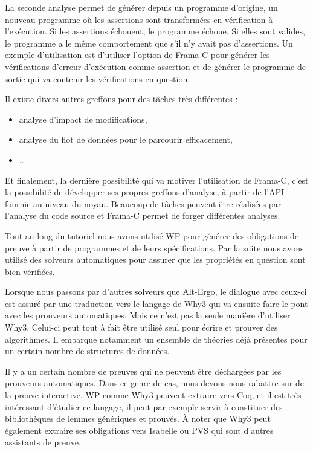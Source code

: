 \documentclass[middle]{zmdocument}
\begin{document}
La seconde analyse permet de générer depuis un programme d'origine, un nouveau
programme où les assertions sont transformées en vérification à l'exécution. Si
les assertions échouent, le programme échoue. Si elles sont valides, le programme
a le même comportement que s'il n'y avait pas d'assertions. Un exemple 
d'utilisation est d'utiliser l'option  de Frama-C pour générer les 
vérifications d'erreur d'exécution comme assertion et de générer le programme de 
sortie qui va contenir les vérifications en question.



Il existe divers autres greffons pour des tâches très différentes :



\begin{itemize}
\item analyse d'impact de modifications,
\item analyse du flot de données pour le parcourir efficacement,
\item ...
\end{itemize}


Et finalement, la dernière possibilité qui va motiver l'utilisation de Frama-C,
c'est la possibilité de développer ses propres greffons d'analyse, à partir de
l'API fournie au niveau du noyau. Beaucoup de tâches peuvent être réalisées par
l'analyse du code source et Frama-C permet de forger différentes analyses.





Tout au long du tutoriel nous avons utilisé WP pour générer des obligations de 
preuve à partir de programmes et de leurs spécifications. Par la suite nous avons
utilisé des solveurs automatiques pour assurer que les propriétés en question sont
bien vérifiées.



Lorsque nous passons par d'autres solveurs que Alt-Ergo, le dialogue avec ceux-ci
est assuré par une traduction vers le langage de Why3 qui va ensuite faire le pont
avec les prouveurs automatiques. Mais ce n'est pas la seule manière d'utiliser 
Why3. Celui-ci peut tout à fait être utilisé seul pour écrire et prouver des
algorithmes. Il embarque notamment un ensemble de théories déjà présentes pour un
certain nombre de structures de données.



Il y a un certain nombre de preuves qui ne peuvent être déchargées par les 
prouveurs automatiques. Dans ce genre de cas, nous devons nous rabattre sur de la 
preuve interactive. WP comme Why3 peuvent extraire vers Coq, et il est très
intéressant d'étudier ce langage, il peut par exemple servir à constituer des 
bibliothèques de lemmes génériques et prouvés. À noter que Why3 peut également
extraire ses obligations vers Isabelle ou PVS qui sont d'autres assistants de
preuve.
\end{document}
